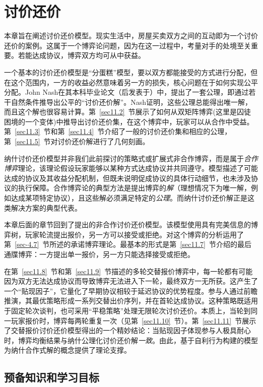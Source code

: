 \chapter{讨价还价} \label{ch11:chap11}

本章旨在阐述讨价还价模型。现实生活中，房屋买卖双方之间的互动即为一个讨价还价的案例。这属于一个博弈论问题，因为在这一过程中，考量对手的处境至关重要。若能达成协议，博弈双方均可从中获益。

一个基本的讨价还价模型是“分蛋糕”模型，要以双方都能接受的方式进行分配，但在这个范围内，一方的收益必然意味着另一方的损失，核心问题在于如何实现公平分配。John Nash在其本科毕业论文（后发表于\citet{nash1950}）中，提出了一套公理，即通过若干自然条件推导出公平的“讨价还价解”。Nash证明，这些公理总能得出唯一解，而且这个解也很容易计算。第~\ref{sec11.2}~节展示了如何从双矩阵博弈(这里是囚徒困境的一个变体)中推导出讨价还价集，在这个博弈中，玩家可以从合作中受益。第~\ref{sec11.3}~节和第~\ref{sec11.4}~节介绍了一般的讨价还价集和相应的公理，第~\ref{sec11.5}~节对讨价还价解进行了几何刻画。

纳什讨价还价模型并非我们此前探讨的策略式或扩展式非合作博弈，而是属于\textit{合作博弈}理论，该理论假设玩家能够以某种方式达成协议并共同遵守。模型描述了可能达成的协议及其收益分配机制，但既未说明促成协议的具体行动细节，也未涉及协议的执行保障。合作博弈论的典型方法是提出博弈的\textit{解}（理想情况下为唯一解，例如达成某项特定协议），且这些解必须满足特定的\textit{公理}。而纳什讨价还价解正是这类解决方案的典型代表。

本章后面的章节回到了\citet{rubinstein1982}提出的非合作讨价还价模型。该模型使用具有完美信息的博弈树，玩家轮流提出报价，另一方可以接受或拒绝。对这个博弈的分析运用了第~\ref{sec-4.7}~节所述的承诺博弈理论。最基本的形式是第~\ref{sec11.7}~节介绍的最后通牒博弈：一方提出单一报价，另一方只能选择接受或拒绝。

在第~\ref{sec11.8}~节和第~\ref{sec11.9}~节描述的多轮交替报价博弈中，每一轮都有可能因为双方无法达成协议而导致博弈无法进入下一轮，最终双方一无所获。这产生了一个“贴现因子”，它量化了早期协议相较于延迟协议的优势程度。参与人通过前瞻推演，其最优策略形成一系列交替出价序列，并在首轮达成协议。这种策略既适用于固定轮次谈判，也可采用“平稳策略”处理无限轮次讨价还价。本质上，当轮到同一玩家报价时，博弈每两轮重复一次（见第~\ref{sec11.10}~节）。第~\ref{sec11.11}~节展示了交替报价讨价还价模型得出的一个精妙结论：当贴现因子体现参与人极具耐心时，博弈均衡结果与纳什公理化讨价还价解\textit{一致}。由此，基于自利行为构建的模型为纳什合作式解的概念提供了理论支撑。


\section{预备知识和学习目标}\label{sec11.1}

